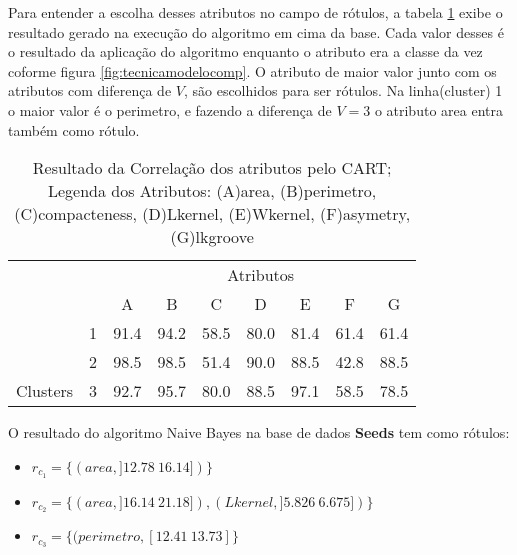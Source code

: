 Para entender a escolha desses atributos no campo de rótulos, a tabela \ref{tab:matrelevancia:seeds:cart} exibe o resultado gerado na execução do algoritmo em cima da base. Cada valor desses é o resultado da aplicação do algoritmo enquanto o atributo era a classe da vez coforme figura \ref{fig:tecnicamodelocomp}. O atributo de maior valor junto com os atributos com diferença de ${V}$, são escolhidos para ser rótulos. Na linha(cluster) 1 o maior valor é o perimetro, e fazendo a diferença de ${V=3}$ o atributo area entra também como rótulo.




\begin{table}[!h]
    
    \caption{Resultado da Correlação dos atributos pelo CART; Legenda dos Atributos: (A)area, (B)perimetro, (C)compacteness, (D)Lkernel, (E)Wkernel, (F)asymetry, (G)lkgroove}    
    \centering
   \small\addtolength{\tabcolsep}{+2pt}
    \begin{tabular}{|cl|c|c|c|c|c|c|c|}
        \hline \hline
                                &   & \multicolumn{7}{c|}{Atributos}          \\ \cline{3-9} 
        \multicolumn{1}{|l}{}                            &   & A    & B & C & D & E & F & G \\ \hline
        \multicolumn{1}{|c|}{}                           & 1 & 91.4 & 94.2   & 58.5      & 80.0 & 81.4 & 61.4   & 61.4   \\ \cline{2-9} 
        \multicolumn{1}{|c|}{}                           & 2 & 98.5 & 98.5   & 51.4      & 90.0 & 88.5 & 42.8  & 88.5  \\ \cline{2-9} 
        \multicolumn{1}{|c|}{\multirow{-3}{*}{Clusters}} & 3 & 92.7 & 95.7   & 80.0      & 88.5 & 97.1 & 58.5  & 78.5  \\ \hline
    \end{tabular}
    \label{tab:matrelevancia:seeds:cart} 
\end{table}

O resultado do algoritmo Naive Bayes na base de dados \textbf{Seeds} tem como rótulos: 
\begin{itemize}[noitemsep]
 \item ${r_{c_1}=\{ (area, ]12.78 ~ 16.14]) \} }$  
 \item ${r_{c_2}=\{ (area, ]16.14 ~ 21.18]), (Lkernel, ]5.826 ~ 6.675]) \} }$
 \item ${r_{c_3}=\{ (perimetro, [12.41 ~ 13.73]\} }$
\end{itemize}




